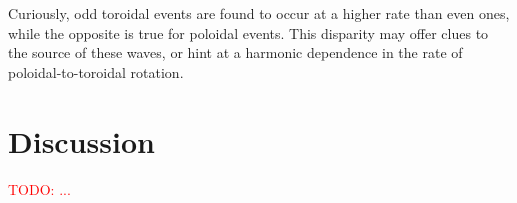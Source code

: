 \documentclass{article}
\newcommand{\todo}[1]{ \textcolor{red}{TODO: #1} }
\begin{document}
Curiously, odd toroidal events are found to occur at a higher rate than
even ones, while the opposite is true for poloidal events. This
disparity may offer clues to the source of these waves, or hint at a
harmonic dependence in the rate of poloidal-to-toroidal rotation.




\section{Discussion}

\todo{...}






\end{document}
